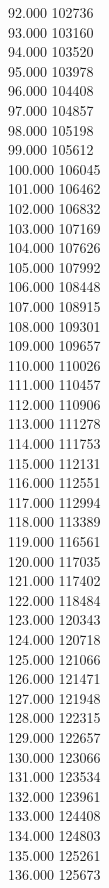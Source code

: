 { 92.000	102736 \\
 93.000	103160 \\
 94.000	103520 \\
 95.000	103978 \\
 96.000	104408 \\
 97.000	104857 \\
 98.000	105198 \\
 99.000	105612 \\
 100.000	106045 \\
 101.000	106462 \\
 102.000	106832 \\
 103.000	107169 \\
 104.000	107626 \\
 105.000	107992 \\
 106.000	108448 \\
 107.000	108915 \\
 108.000	109301 \\
 109.000	109657 \\
 110.000	110026 \\
 111.000	110457 \\
 112.000	110906 \\
 113.000	111278 \\
 114.000	111753 \\
 115.000	112131 \\
 116.000	112551 \\
 117.000	112994 \\
 118.000	113389 \\
 119.000	116561 \\
 120.000	117035 \\
 121.000	117402 \\
 122.000	118484 \\
 123.000	120343 \\
 124.000	120718 \\
 125.000	121066 \\
 126.000	121471 \\
 127.000	121948 \\
 128.000	122315 \\
 129.000	122657 \\
 130.000	123066 \\
 131.000	123534 \\
 132.000	123961 \\
 133.000	124408 \\
 134.000	124803 \\
 135.000	125261 \\
 136.000	125673 \\
}
